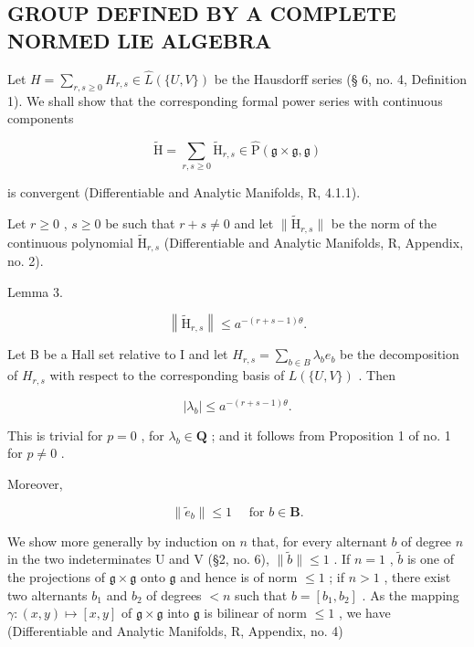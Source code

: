 \subsection{GROUP DEFINED BY A COMPLETE NORMED LIE ALGEBRA}

Let \(H = \sum_{r,s \geq 0} H_{r,s} \in \hat{L}(\{U, V\})\) be the Hausdorff series (§ 6, no. 4, Definition 1). We shall show that the corresponding formal power series with continuous components

\[
\tilde {\mathrm{H}} = \sum_ {r, s \geqslant 0} \tilde {\mathrm{H}} _ {r, s} \in \hat {\mathrm{P}} (\mathfrak {g} \times \mathfrak {g}, \mathfrak {g})\tag{10}
\]

is convergent (Differentiable and Analytic Manifolds, R, 4.1.1).

Let \(r \geqslant 0\) , \(s \geqslant 0\) be such that \(r + s \neq 0\) and let \(\| \tilde{\mathrm{H}}_{r,s} \|\) be the norm of the continuous polynomial \(\tilde{\mathrm{H}}_{r,s}\) (Differentiable and Analytic Manifolds, R, Appendix, no. 2).

Lemma 3.

\[
\left\| \tilde {\mathrm{H}} _ {r, s} \right\| \leqslant a ^ {- (r + s - 1) \theta}.
\]

Let B be a Hall set relative to I and let \(H_{r,s} = \sum_{b \in B} \lambda_b e_b\) be the decomposition of \(H_{r,s}\) with respect to the corresponding basis of \(L(\{U, V\})\) . Then

\[
\left| \lambda_ {b} \right| \leqslant a ^ {- (r + s - 1) \theta}.\tag{11}
\]

This is trivial for \(p = 0\) , for \(\lambda_b \in \mathbf{Q}\) ; and it follows from Proposition 1 of no. 1 for \(p \neq 0\) .

Moreover,

\[
\left\| \tilde {e} _ {b} \right\| \leqslant 1 \quad \text { for } b \in \mathbf {B}.\tag{12}
\]

We show more generally by induction on \(n\) that, for every alternant \(b\) of degree \(n\) in the two indeterminates U and V (§2, no. 6), \(\| \tilde{b} \| \leqslant 1\) . If \(n = 1\) , \(\tilde{b}\) is one of the projections of \(\mathfrak{g} \times \mathfrak{g}\) onto \(\mathfrak{g}\) and hence is of norm \(\leqslant 1\) ; if \(n > 1\) , there exist two alternants \(b_1\) and \(b_2\) of degrees \(< n\) such that \(b = [b_1, b_2]\) . As the mapping \(\gamma: (x, y) \mapsto [x, y]\) of \(\mathfrak{g} \times \mathfrak{g}\) into \(\mathfrak{g}\) is bilinear of norm \(\leqslant 1\) , we have (Differentiable and Analytic Manifolds, R, Appendix, no. 4)

